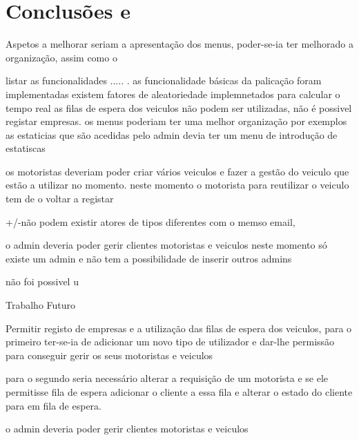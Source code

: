 \chapter{Conclusões e }

Aspetos a melhorar seriam a apresentação dos menus, poder-se-ia ter melhorado a organização, assim como o 

listar as funcionalidades ..... 
. as funcionalidade básicas da palicação foram implementadas 
existem fatores de aleatoriedade implemnetados para calcular o tempo real 
as filas de espera dos veiculos não podem ser utilizadas, 
não é possivel registar empresas. 
os menus poderiam ter uma melhor organização por exemplos as estaticias que são acedidas pelo admin devia ter um menu de introdução de estatiscas 

os motoristas deveriam poder criar vários veiculos e fazer a gestão do veiculo que estão a utilizar no momento. neste momento o motorista para reutilizar o veiculo tem de o voltar a registar 

+/-não podem existir atores de tipos diferentes com o memso email, 

o admin deveria poder gerir clientes motoristas e veiculos 
neste momento só existe um admin e não tem a possibilidade de inserir outros admins 

não foi possivel u

Trabalho Futuro

Permitir registo de empresas e a utilização das filas de espera dos veiculos, para o primeiro ter-se-ia de adicionar um novo tipo de utilizador e dar-lhe permissão para conseguir gerir os seus motoristas e veiculos 

para o segundo seria necessário alterar a requisição de um motorista e  se ele permitisse fila de espera adicionar o cliente a essa fila e alterar o estado do cliente para em fila de espera. 

o admin deveria poder gerir clientes motoristas e veiculos



